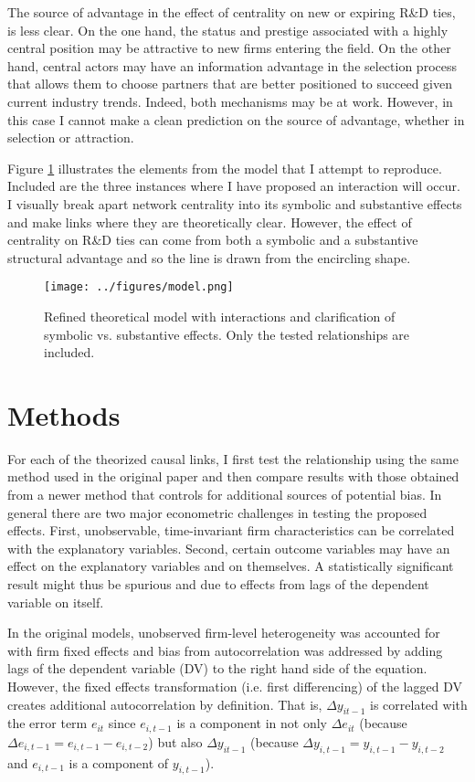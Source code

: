 The source of advantage in the effect of centrality on new or expiring R\&D ties, is less clear. On the one hand, the status and prestige associated with a highly central position may be attractive to new firms entering the field. On the other hand, central actors may have an information advantage in the selection process that allows them to choose partners that are better positioned to succeed given current industry trends. Indeed, both mechanisms may be at work. However, in this case I cannot make a clean prediction on the source of advantage, whether in selection or attraction.

Figure \ref{model} illustrates the elements from the \citet{powell1999} model that I attempt to reproduce. Included are the three instances where I have proposed an interaction will occur. I visually break apart network centrality into its symbolic and substantive effects and make links where they are theoretically clear. However, the effect of centrality on R\&D ties can come from both a symbolic and a substantive structural advantage and so the line is drawn from the encircling shape.

\begin{figure}
\begin{center}
\texttt{[image: ../figures/model.png]}
\caption[Refined Theoretical Model]{Refined theoretical model with interactions and clarification of symbolic vs. substantive effects. Only the tested relationships are included.\label{model}}
\end{center}
\end{figure}

\section{Methods}

For each of the theorized causal links, I first test the relationship using the same method used in the original paper and then compare results with those obtained from a newer method that controls for additional sources of potential bias. In general there are two major econometric challenges in testing the proposed effects. First, unobservable, time-invariant firm characteristics can be correlated with the explanatory variables. Second, certain outcome variables may have an effect on the explanatory variables and on themselves. A statistically significant result might thus be spurious and due to effects from lags of the dependent variable on itself.

In the original models, unobserved firm-level heterogeneity was accounted for with firm fixed effects and bias from autocorrelation was addressed by adding lags of the dependent variable (DV) to the right hand side of the equation. However, the fixed effects transformation (i.e. first differencing) of the lagged DV creates additional autocorrelation by definition. That is, $\Delta y_{it-1}$ is correlated with the error term $e_{it}$ since $e_{i,t-1}$ is a component in not only $\Delta e_{it}$ (because $\Delta e_{i,t-1} = e_{i,t-1}-e_{i,t-2}$) but also $\Delta y_{it-1}$ (because $\Delta y_{i,t-1} = y_{i,t-1}-y_{i,t-2}$ and $e_{i,t-1}$ is a component of $y_{i,t-1}$).

